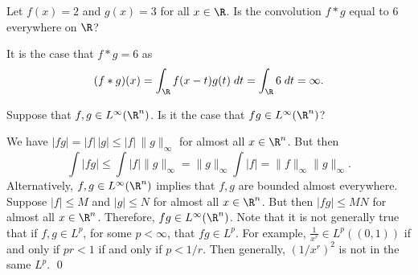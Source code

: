 \begin{quizsol}
Let $f(x)=2$ and $g(x)=3$ for all $x \in \R$. Is the convolution $f*g$ equal to 6 everywhere on $\R$?
\end{quizsol}

\pf It is the case that $f*g=6$ as
	\[
	(f*g)(x)= \int_\R f(x-t)g(t) \; dt= \int_\R 6 \; dt = \infty.
	\]


\begin{quizsol}
Suppose that $f,g \in L^\infty(\R^n)$. Is it the case that $fg \in L^\infty(\R^n)$? 
\end{quizsol}

\pf We have $|fg|=|f|\,|g| \leq |f| \, \|g\|_\infty$ for almost all $x \in \R^n$. But then
	\[
	\int |fg| \leq \int |f| \|g\|_\infty = \|g\|_\infty \int |f|= \|f\|_\infty \|g\|_\infty. 
	\]
Alternatively, $f,g \in L^\infty(\R^n)$ implies that $f,g$ are bounded almost everywhere. Suppose $|f| \leq M$ and $|g| \leq N$ for almost all $x \in \R^n$. But then $|fg| \leq MN$ for almost all $x \in \R^n$. Therefore, $fg \in L^\infty(\R^n)$. Note that it is not generally true that if $f,g \in L^p$, for some $p<\infty$, that $fg \in L^p$. For example, $\frac{1}{x^r} \in L^p((0,1))$ if and only if $pr<1$ if and only if $p<1/r$. Then generally, $(1/x^r)^2$ is not in the same $L^p$. \qed \\




















